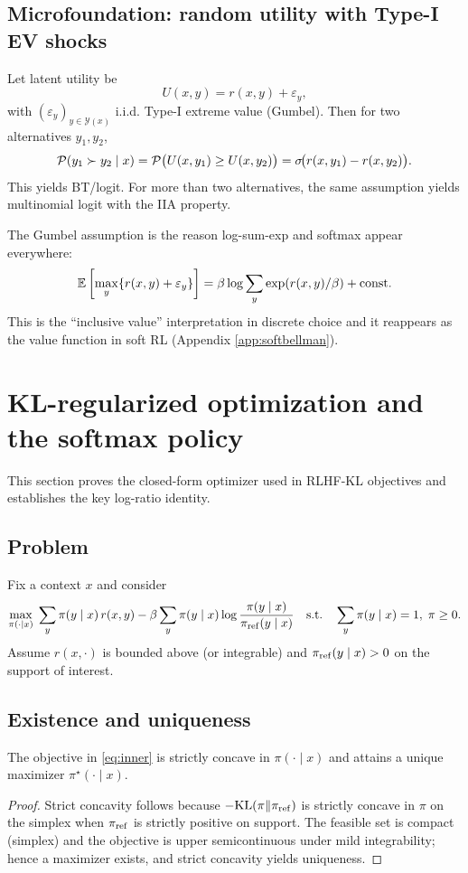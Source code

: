 \subsection{Microfoundation: random utility with Type-I EV shocks}
Let latent utility be
\[
U(x,y)=r(x,y)+\varepsilon_y,
\]
with $(\varepsilon_y)_{y\in\mathcal{Y}(x)}$ i.i.d. Type-I extreme value (Gumbel).
Then for two alternatives $y_1,y_2$,
\[
\mathcal{P}(y_1 \succ y_2 \mid x)
=
\mathcal{P}\big(U(x,y_1)\ge U(x,y_2)\big)
=
\sigma\!\big(r(x,y_1)-r(x,y_2)\big).
\]
This yields BT/logit. For more than two alternatives, the same assumption yields multinomial logit with the IIA property.

\begin{remark}
The Gumbel assumption is the reason log-sum-exp and softmax appear everywhere:
\[
\mathbb{E}\left[\max_{y}\{r(x,y)+\varepsilon_y\}\right]
=
\beta \log \sum_y \exp(r(x,y)/\beta) + \text{const}.
\]
This is the ``inclusive value'' interpretation in discrete choice and it reappears as the value function in soft RL (Appendix \ref{app:softbellman}).
\end{remark}

\section{KL-regularized optimization and the softmax policy}\label{app:kl}

This section proves the closed-form optimizer used in RLHF-KL objectives and establishes the key log-ratio identity.

\subsection{Problem}
Fix a context $x$ and consider
\begin{equation}\label{eq:inner}
\max_{\pi(\cdot\mid x)}\;
\sum_{y}\pi(y\mid x)\,r(x,y)
-
\beta\sum_{y}\pi(y\mid x)\log\frac{\pi(y\mid x)}{\pi_{\mathrm{ref}}(y\mid x)}
\quad\text{s.t.}\quad
\sum_y \pi(y\mid x)=1,\;\pi\ge 0.
\end{equation}
Assume $r(x,\cdot)$ is bounded above (or integrable) and $\pi_{\mathrm{ref}}(y\mid x)>0$ on the support of interest.

\subsection{Existence and uniqueness}
\begin{lemma}
The objective in \eqref{eq:inner} is strictly concave in $\pi(\cdot\mid x)$ and attains a unique maximizer $\pi^\star(\cdot\mid x)$.
\end{lemma}
\begin{proof}
Strict concavity follows because $-\mathrm{KL}(\pi\|\pi_{\mathrm{ref}})$ is strictly concave in $\pi$ on the simplex when $\pi_{\mathrm{ref}}$ is strictly positive on support.
The feasible set is compact (simplex) and the objective is upper semicontinuous under mild integrability; hence a maximizer exists, and strict concavity yields uniqueness.
\end{proof}

